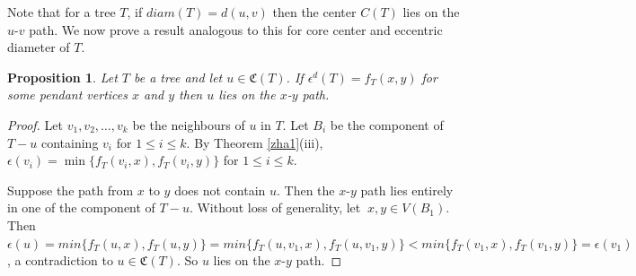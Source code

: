 \documentclass[11pt]{article}
\newtheorem{proposition}[theorem]{Proposition}
\begin{document}
Note that for a tree $T$, if $diam(T)=d(u,v)$ then the center $C(T)$ lies on the $u$-$v$ path. We now prove a result analogous to this for core center and eccentric diameter of $T$.
\begin{proposition}\label{prop1}
Let $T$ be a tree and let $u\in \mathfrak{C}(T)$. If $\epsilon^d(T)=f_T(x,y)$ for some pendant vertices $x$ and $y$ then $u$ lies on the $x$-$y$ path. 
\end{proposition}
\begin{proof}
Let $v_1,v_2,\ldots, v_k$ be the neighbours of $u$ in $T$. Let $B_i$ be the component of $T-u$ containing $v_i$ for $1\leq i \leq k$. By Theorem \ref{zha1}(iii), $\epsilon(v_i)=\min\{f_T(v_i,x), f_T(v_i,y)\}$ for $1\leq i \leq k$.

Suppose the path from $x$ to $y$ does not contain $u$. Then the $x$-$y$ path lies entirely in one of the component of $T-u$. Without loss of generality, let  $\ x,y\in V(B_1)$. Then $\epsilon(u)=min\{f_T(u,x), f_T(u,y)\}=min\{f_T(u,v_1,x), f_T(u,v_1,y)\}< min\{f_T(v_1,x), f_T(v_1,y)\}=\epsilon (v_1)$, a contradiction to $u\in \mathfrak{C}(T)$. So $u$ lies on the $x$-$y$ path. 
\end{proof}
\end{document}
